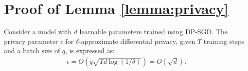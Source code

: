 \clearpage


\section{Proof of Lemma \ref{lemma:privacy} } \label{app:proof_priv}
\begin{tcolorbox}[colback=cyan!10,colframe=black]
\begin{lemma*}
    Consider a model with \( d \) learnable parameters trained using DP-SGD. The privacy parameter \( \epsilon \) for \( \delta \)-approximate differential privacy, given \( T \) training steps and a batch size of \( q \), is expressed as:
\begin{align}
    \epsilon = O(q \sqrt{T d \log (1 / \delta)}) = O(\sqrt{d}).
\end{align}
\end{lemma*}
\end{tcolorbox}

